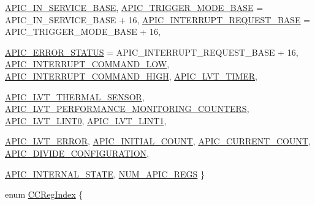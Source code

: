 \begin{DoxyCompactItemize}
\hyperlink{namespaceX86ISA_aaa839fcdf6f426c03c7382fcc29ac649ab44e07d8e0d33a340f8d69334f0a3382}{APIC\_\-IN\_\-SERVICE\_\-BASE}, 
\hyperlink{namespaceX86ISA_aaa839fcdf6f426c03c7382fcc29ac649a579e62281d1a2f66fe39809a385f90ae}{APIC\_\-TRIGGER\_\-MODE\_\-BASE} =  APIC\_\-IN\_\-SERVICE\_\-BASE + 16, 
\hyperlink{namespaceX86ISA_aaa839fcdf6f426c03c7382fcc29ac649a2ee7104372cb641092daabc28ffdd0c1}{APIC\_\-INTERRUPT\_\-REQUEST\_\-BASE} =  APIC\_\-TRIGGER\_\-MODE\_\-BASE + 16, 
\par
\hyperlink{namespaceX86ISA_aaa839fcdf6f426c03c7382fcc29ac649a56d3d52b81eeb1310a517a97474a110d}{APIC\_\-ERROR\_\-STATUS} =  APIC\_\-INTERRUPT\_\-REQUEST\_\-BASE + 16, 
\hyperlink{namespaceX86ISA_aaa839fcdf6f426c03c7382fcc29ac649a4fa27532542040e5d73d4e69e0d0a07d}{APIC\_\-INTERRUPT\_\-COMMAND\_\-LOW}, 
\hyperlink{namespaceX86ISA_aaa839fcdf6f426c03c7382fcc29ac649aa54f4f509b32a83bddec4a363c00cb11}{APIC\_\-INTERRUPT\_\-COMMAND\_\-HIGH}, 
\hyperlink{namespaceX86ISA_aaa839fcdf6f426c03c7382fcc29ac649ad1228146fe200dc1da0a4e48613e64de}{APIC\_\-LVT\_\-TIMER}, 
\par
\hyperlink{namespaceX86ISA_aaa839fcdf6f426c03c7382fcc29ac649ae6a8e929de3184f5e54eb2300b60c6a9}{APIC\_\-LVT\_\-THERMAL\_\-SENSOR}, 
\hyperlink{namespaceX86ISA_aaa839fcdf6f426c03c7382fcc29ac649a769c40616c8b9b7de024051b04227dbb}{APIC\_\-LVT\_\-PERFORMANCE\_\-MONITORING\_\-COUNTERS}, 
\hyperlink{namespaceX86ISA_aaa839fcdf6f426c03c7382fcc29ac649ab07382707bac04fc055c6ca577127989}{APIC\_\-LVT\_\-LINT0}, 
\hyperlink{namespaceX86ISA_aaa839fcdf6f426c03c7382fcc29ac649ac67e062e54bcdd8c8003f591079d8e51}{APIC\_\-LVT\_\-LINT1}, 
\par
\hyperlink{namespaceX86ISA_aaa839fcdf6f426c03c7382fcc29ac649ab452bdc9e036517c83e9bb804123bce8}{APIC\_\-LVT\_\-ERROR}, 
\hyperlink{namespaceX86ISA_aaa839fcdf6f426c03c7382fcc29ac649ae716a6476f2512f58b1a277adc2a2e7d}{APIC\_\-INITIAL\_\-COUNT}, 
\hyperlink{namespaceX86ISA_aaa839fcdf6f426c03c7382fcc29ac649a58280c164e1ac7ce1f96388426eedae2}{APIC\_\-CURRENT\_\-COUNT}, 
\hyperlink{namespaceX86ISA_aaa839fcdf6f426c03c7382fcc29ac649a8222bef49f213396d8e7355618db1a19}{APIC\_\-DIVIDE\_\-CONFIGURATION}, 
\par
\hyperlink{namespaceX86ISA_aaa839fcdf6f426c03c7382fcc29ac649a6cee13db3ff4d842d6f69f8b4d3ebec7}{APIC\_\-INTERNAL\_\-STATE}, 
\hyperlink{namespaceX86ISA_aaa839fcdf6f426c03c7382fcc29ac649acac3cc02926b9ee42adeac70e95690ec}{NUM\_\-APIC\_\-REGS}
 \}
\item 
enum \hyperlink{namespaceX86ISA_ac8fc3c727b3f9650424d1091e300aab7}{CCRegIndex} \{ \par

\end{DoxyCompactItemize}
